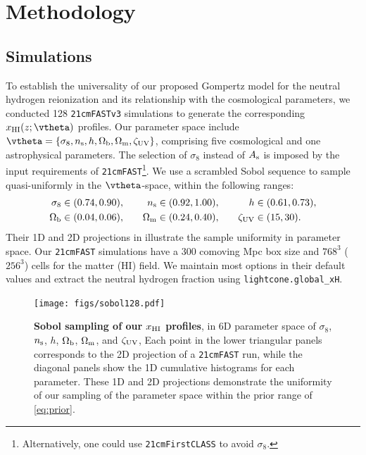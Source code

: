 \section*{Methodology}
\label{sec:methods}

\subsection*{Simulations}
\label{ssec:sims}

To establish the universality of our proposed Gompertz model for the
neutral hydrogen reionization and its relationship with the cosmological
parameters, we conducted 128 \texttt{21cmFASTv3} simulations to generate
the corresponding $x_\HI(z; \vtheta)$ profiles.
Our parameter space include $\vtheta = \{\sigma_8, \ns, h, \Omegab,
\Omegam, \zetaUV\}$, comprising five cosmological and one astrophysical
parameters.
The selection of $\sigma_8$ instead of $A_\mathrm{s}$ is imposed by the input
requirements of \texttt{21cmFAST}\footnote{Alternatively, one could use 
\texttt{21cmFirstCLASS}\cite{Flitter2024} to avoid $\sigma_8$.}.
We use a scrambled Sobol sequence \cite{Sobol1967, Owen1998} to sample
quasi-uniformly in the $\vtheta$-space, within the following ranges:
%
\begin{alignat}{3}
\label{eq:prior}
\sigma_8 &\in (0.74, 0.90), &\quad
n_\mathrm{s} &\in (0.92, 1.00), &\quad
h &\in (0.61, 0.73), \nonumber\\
\Omega_\mathrm{b} &\in (0.04, 0.06), &\quad
\Omega_\mathrm{m} &\in (0.24, 0.40), &\quad
\zeta_\mathrm{UV} &\in (15, 30).
\end{alignat}
%
Their 1D and 2D projections in  illustrate the sample
uniformity in parameter space.
Our \texttt{21cmFAST} simulations have a 300 comoving Mpc box size and
$768^3$ ($256^3$) cells for the matter (HI) field.
We maintain most options in their default values and extract the
neutral hydrogen fraction using \texttt{lightcone.global\_xH}.

\begin{figure}[tb]
\centering
\texttt{[image: figs/sobol128.pdf]}
\caption{\textbf{Sobol sampling of our $x_{\mathrm{HI}}$ profiles}, in 6D
parameter space of $\sigma_8$, $n_\mathrm{s}$, $h$, $\Omega_\mathrm{b}$, $\Omega_\mathrm{m}$, and
$\zeta_\mathrm{UV}$,
Each point in the lower triangular panels corresponds to the 2D
projection of a \texttt{21cmFAST} run, while the diagonal panels show
the 1D cumulative histograms for each parameter.
These 1D and 2D projections demonstrate the uniformity of our sampling
of the parameter space within the prior range of \cref{eq:prior}.}
\label{fig:sobol}
\end{figure}


